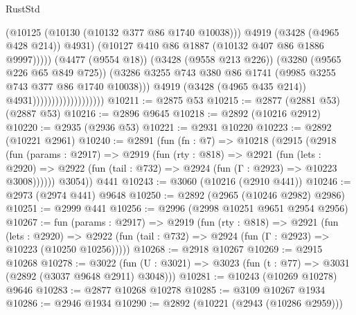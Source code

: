 \begin{lexlean}{RustStd}
\begin{coremodule}
                                                    (@10125 (@10130 (@10132 @377 @86 @1740 @10038)))
                                                    @4919
                                                    (@3428 (@4965 @428 @214))
                                                    @4931)
                                                  (@10127
                                                    @410
                                                    @86
                                                    @1887
                                                    (@10132 @407 @86 @1886 @9997)))))
                                            (@4477 (@9554 @18))
                                            (@3428 (@9558 @213 @226))
                                            (@3280 (@9565 @226 @65 @849 @725))
                                            (@3286
                                              @3255
                                              @743
                                              @380
                                              @86
                                              @1741
                                              (@9985 @3255 @743 @377 @86 @1740 @10038)))
                                          @4919
                                          (@3428 (@4965 @435 @214))
                                          @4931)))))))))))))))))))
@10211 := @2875 @53
@10215 := @2877 (@2881 @53) (@2887 @53)
@10216 := @2896 @9645
@10218 := @2892 (@10216 @2912)
@10220 := @2935 (@2936 @53)
@10221 := @2931 @10220
@10223 := @2892 (@10221 @2961)
@10240 := @2891
    (fun (fn : @7) =>
    @10218
      (@2915
        (@2918
          (fun (params : @2917) =>
          @2919
            (fun (rty : @818) =>
            @2921
              (fun (lets : @2920) =>
              @2922 (fun (tail : @732) => @2924 (fun (Γ : @2923) => @10223 @3008))))))
        @3054))
    @441
@10243 := @3060 (@10216 (@2910 @441))
@10246 := @2973 (@2974 @441) @9648
@10250 := @2892 (@2965 (@10246 @2982) @2986)
@10251 := @2999 @441
@10256 := @2996 (@2998 @10251 @9651 @2954 @2956)
@10267 := fun (params : @2917) =>
  @2919
    (fun (rty : @818) =>
    @2921
      (fun (lets : @2920) =>
      @2922 (fun (tail : @732) => @2924 (fun (Γ : @2923) => @10223 (@10250 @10256)))))
@10268 := @2918 @10267
@10269 := @2915 @10268
@10278 := @3022
    (fun (U : @3021) => @3023 (fun (t : @77) => @3031 (@2892 (@3037 @9648 @2911) @3048)))
@10281 := @10243 (@10269 @10278) @9646
@10283 := @2877 @10268 @10278
@10285 := @3109 @10267 @1934
@10286 := @2946 @1934
@10290 := @2892 (@10221 (@2943 (@10286 @2959)))

\end{coremodule}
\end{lexlean}
